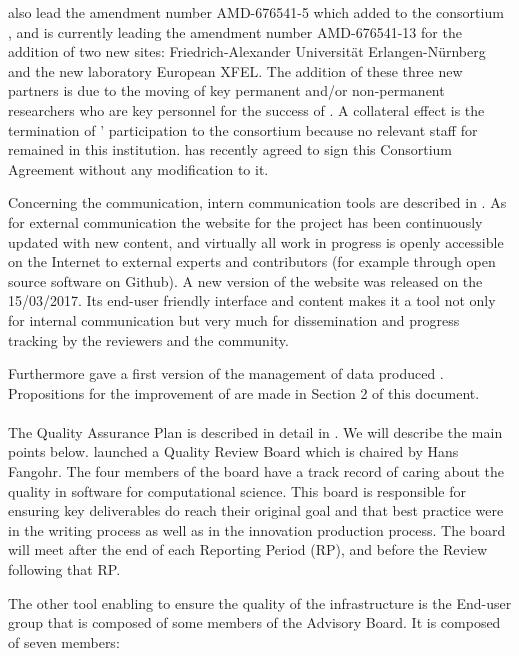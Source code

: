 \documentclass{deliverablereport}
\begin{document}
 also lead the amendment number AMD-676541-5 which added to the consortium , and is currently leading the amendment number AMD-676541-13 for the addition of two new sites: Friedrich-Alexander Universität Erlangen-Nürnberg and the new laboratory European XFEL. The addition of these three new partners is due to the moving of key permanent and/or non-permanent researchers who are key personnel for the success of \ODK. A collateral effect is the termination of ' participation to the consortium because no relevant staff for \ODK remained in this institution.
 has recently agreed to sign this Consortium Agreement
without any modification to it.


Concerning the communication, intern communication tools are described
in . As for external
communication the website for the project has been continuously
updated with new content, and virtually all work in progress is openly
accessible on the Internet to external experts and contributors (for
example through open source software on Github). A new version of the
website was released on the 15/03/2017. Its end-user friendly
interface and content makes it a tool not only for internal
communication but very much for dissemination and progress tracking by
the reviewers and the community.

Furthermore  gave a first version of the management of data produced \ODK. Propositions for the improvement of are made in Section 2 of this document. 


\paragraph{}


The Quality Assurance Plan is described in detail in . We will describe the main points below.
 launched a Quality Review Board which is chaired by Hans Fangohr. The four members of the board have a track record of caring about the quality in software for computational science. This board is responsible for ensuring key deliverables do reach their original goal and that best practice were in the writing process as well as in the innovation production process.
The board will meet after the end of each Reporting Period (RP), and before the Review following that RP.

The other tool enabling \ODK to ensure the quality of the
infrastructure is the End-user group that is composed of some members
of the Advisory Board. It is composed of seven members:
\end{document}
